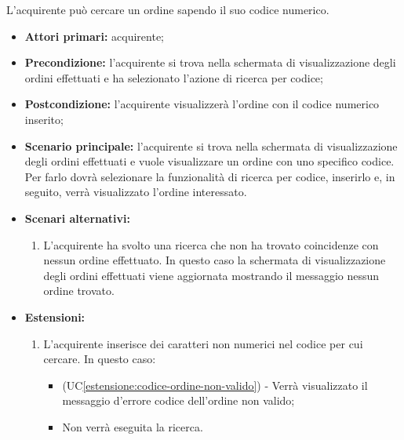 
\label{ricerca-codice-ordine-acquirente}

L'acquirente può cercare un ordine sapendo il suo codice numerico.
\begin{itemize}
    \item \textbf{Attori primari:} acquirente;
    \item \textbf{Precondizione:} l'acquirente si trova nella schermata di visualizzazione degli ordini effettuati e ha selezionato l'azione di ricerca per codice;
    \item \textbf{Postcondizione:} l'acquirente visualizzerà l'ordine con il codice numerico inserito;
    \item \textbf{Scenario principale:} l'acquirente si trova nella schermata di visualizzazione degli ordini effettuati e vuole visualizzare un ordine con uno specifico codice. Per farlo dovrà selezionare la funzionalità di ricerca per codice, inserirlo e, in seguito, verrà visualizzato l'ordine interessato.
    \item \textbf{Scenari alternativi:}
    \begin{enumerate}[label=\lett]
    	\item L'acquirente ha svolto una ricerca che non ha trovato coincidenze con nessun ordine effettuato. In questo caso la schermata di visualizzazione degli ordini effettuati viene aggiornata mostrando il messaggio nessun ordine trovato.
    \end{enumerate}
    \item \textbf{Estensioni:}
    \begin{enumerate}[label=\lett]
        \item L'acquirente inserisce dei caratteri non numerici nel codice per cui cercare. In questo caso:
        \begin{itemize}
            \item (UC\ref{estensione:codice-ordine-non-valido}) - Verrà visualizzato il messaggio d'errore codice dell'ordine non valido;
            \item Non verrà eseguita la ricerca.
        \end{itemize}
    \end{enumerate}
\end{itemize}



